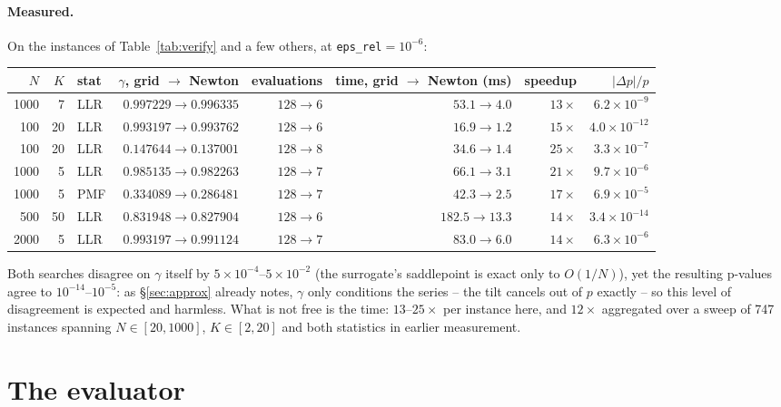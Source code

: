 \documentclass[11pt]{article}
\begin{document}
\paragraph{Measured.} On the instances of Table~\ref{tab:verify} and a few others, at
\texttt{eps\_rel}$=10^{-6}$:

\begin{center}
\small
\begin{tabular}{rrlrrrrr}
\toprule
$N$ & $K$ & stat & $\gamma$, grid $\to$ Newton & evaluations & time, grid $\to$ Newton (ms) & speedup & $|\Delta p|/p$ \\
\midrule
1000 & 7  & LLR & $0.997229\to0.996335$ & $128\to6$  & $53.1\to4.0$   & $13\times$ & $6.2\times10^{-9}$ \\
100  & 20 & LLR & $0.993197\to0.993762$ & $128\to6$  & $16.9\to1.2$   & $15\times$ & $4.0\times10^{-12}$ \\
100  & 20 & LLR & $0.147644\to0.137001$ & $128\to8$  & $34.6\to1.4$   & $25\times$ & $3.3\times10^{-7}$ \\
1000 & 5  & LLR & $0.985135\to0.982263$ & $128\to7$  & $66.1\to3.1$   & $21\times$ & $9.7\times10^{-6}$ \\
1000 & 5  & PMF & $0.334089\to0.286481$ & $128\to7$  & $42.3\to2.5$   & $17\times$ & $6.9\times10^{-5}$ \\
500  & 50 & LLR & $0.831948\to0.827904$ & $128\to6$  & $182.5\to13.3$ & $14\times$ & $3.4\times10^{-14}$ \\
2000 & 5  & LLR & $0.993197\to0.991124$ & $128\to7$  & $83.0\to6.0$   & $14\times$ & $6.3\times10^{-6}$ \\
\bottomrule
\end{tabular}
\end{center}
Both searches disagree on $\gamma$ itself by $5\times10^{-4}$--$5\times10^{-2}$ (the surrogate's
saddlepoint is exact only to $O(1/N)$), yet the resulting p-values agree to $10^{-14}$--$10^{-5}$:
as \S\ref{sec:approx} already notes, $\gamma$ only conditions the series -- the tilt cancels out of
$p$ exactly -- so this level of disagreement is expected and harmless. What is not free is the time:
$13$--$25\times$ per instance here, and $12\times$ aggregated over a sweep of 747 instances spanning
$N\in[20,1000]$, $K\in[2,20]$ and both statistics in earlier measurement.

\section{The evaluator}
\label{sec:impl}
\end{document}
